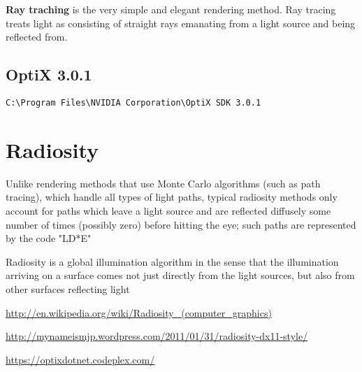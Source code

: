 {\bf Ray traching} is the very simple and elegant rendering
method. Ray tracing treats light as consisting of straight rays emanating from a light
source and being reflected from.


\subsection{OptiX 3.0.1}

\begin{verbatim}
C:\Program Files\NVIDIA Corporation\OptiX SDK 3.0.1
\end{verbatim}

\section{Radiosity}
\label{sec:radiosity}  

Unlike rendering methods that use Monte Carlo algorithms (such as path tracing),
which handle all types of light paths, typical radiosity methods only account
for paths which leave a light source and are reflected diffusely some number of
times (possibly zero) before hitting the eye; such paths are represented by the
code "LD*E"   

Radiosity is a global illumination algorithm in the sense that the illumination
arriving on a surface comes not just directly from the light sources, but also
from other surfaces reflecting light  

\url{http://en.wikipedia.org/wiki/Radiosity_(computer_graphics)}

\url{http://mynameismjp.wordpress.com/2011/01/31/radiosity-dx11-style/}

\url{https://optixdotnet.codeplex.com/}